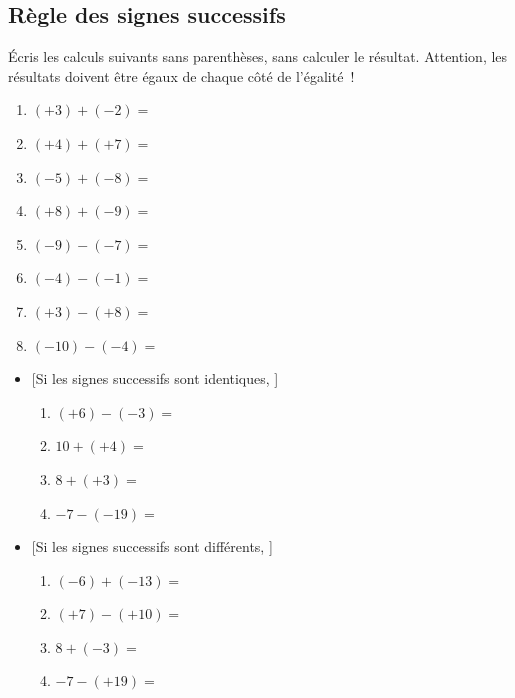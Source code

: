 \documentclass[../../syllabus_1.tex]{subfiles}
\begin{document}
\subsection{Règle des signes successifs}

Écris les calculs suivants sans parenthèses, sans calculer le résultat. Attention, les résultats doivent être égaux de chaque côté de l'égalité~!
\begin{enumerate}[cols=2, itemsep=2em]
    \item $( + 3) + ( - 2) =$
    \item $( + 4) + ( + 7) =$
    \item $( - 5) + ( - 8) =$
    \item $( + 8) + ( - 9) =$
    \item $( - 9) - ( - 7) =$
    \item $(-4)-(-1)=$
    \item $( + 3) - ( + 8) =$
    \item $( - 10) - ( - 4) =$
\end{enumerate}
\vspace{1cm}

\begin{itemize}[label=$\bullet$]
    \item {}[Si les signes successifs sont identiques, ]
          \begin{enumerate}[cols=2, itemsep=1cm, label=\ ]
              \item $\left(+6\right) - \left(-3\right)=$
              \item $10 + (+4)=$
              \item $8 + \left(+3\right)=$
              \item $-7 - (-19)=$
                    \vspace{1cm}
          \end{enumerate}
          \vfil
    \item {}[Si les signes successifs sont différents, ]
          \begin{enumerate}[cols=2, itemsep=1cm, label=\ ]
              \item $\left(-6\right) + \left(-13\right)=$
              \item $\left(+7\right) - \left(+10\right)=$
              \item $8 + \left(-3\right)=$
              \item $-7 - (+19)=$
                    \vspace{1cm}
          \end{enumerate}
\end{itemize}
\end{document}
